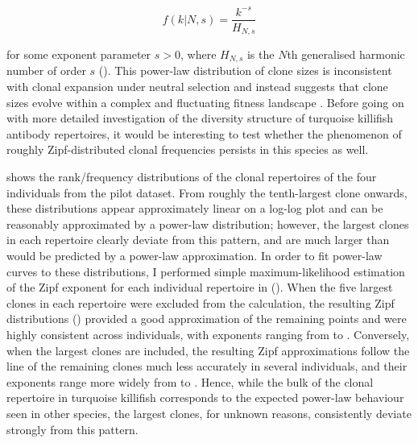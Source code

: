 \begin{equation}
f(k | N, s) = \frac{k^{-s}}{H_{N,s}}
\end{equation}

\noindent for some exponent parameter $s > 0$, where $H_{N,s}$ is the $N$th generalised harmonic number of order $s$ (). This power-law distribution of clone sizes is inconsistent with clonal expansion under neutral selection and instead suggests that clone sizes evolve within a complex and fluctuating fitness landscape \parencite{desponds2016fluctuating}. Before going on with more detailed investigation of the diversity structure of turquoise killifish antibody repertoires, it would be interesting to test whether the phenomenon of roughly Zipf-distributed clonal frequencies persists in this species as well.

 shows the rank/frequency distributions of the clonal repertoires of the four individuals from the pilot dataset. From roughly the tenth-largest clone onwards, these distributions appear approximately linear on a log-log plot and can be reasonably approximated by a power-law distribution; however, the largest clones in each repertoire clearly deviate from this pattern, and are much larger than would be predicted by a power-law approximation. In order to fit power-law curves to these distributions, I performed simple maximum-likelihood estimation of the Zipf exponent for each individual repertoire in  (). When the five largest clones in each repertoire were excluded from the calculation, the resulting Zipf distributions () provided a good approximation of the remaining points and were highly consistent across individuals, with exponents ranging from  to . Conversely, when the largest clones are included, the resulting Zipf approximations follow the line of the remaining clones much less accurately in several individuals, and their exponents range more widely from  to . Hence, while the bulk of the clonal repertoire in turquoise killifish corresponds to the expected power-law behaviour seen in other species, the largest clones, for unknown reasons, consistently deviate strongly from this pattern.

